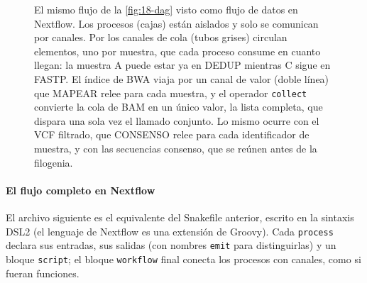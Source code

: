 \begin{figure}[t]
\caption[Canales y procesos en Nextflow]{El mismo flujo de la \cref{fig:18-dag} visto como flujo de datos en Nextflow. Los procesos (cajas) están aislados y solo se comunican por canales. Por los canales de cola (tubos grises) circulan elementos, uno por muestra, que cada proceso consume en cuanto llegan: la muestra A puede estar ya en DEDUP mientras C sigue en FASTP. El índice de BWA viaja por un canal de valor (doble línea) que MAPEAR relee para cada muestra, y el operador \texttt{collect} convierte la cola de BAM en un único valor, la lista completa, que dispara una sola vez el llamado conjunto. Lo mismo ocurre con el VCF filtrado, que CONSENSO relee para cada identificador de muestra, y con las secuencias consenso, que se reúnen antes de la filogenia.}
\label{fig:18-canales}
\end{figure}

\paragraph{El flujo completo en Nextflow} El archivo  siguiente es el equivalente del Snakefile anterior, escrito en la sintaxis DSL2 (el lenguaje de Nextflow es una extensión de Groovy). Cada \texttt{process} declara sus entradas, sus salidas (con nombres \texttt{emit} para distinguirlas) y un bloque \texttt{script}; el bloque \texttt{workflow} final conecta los procesos con canales, como si fueran funciones.

